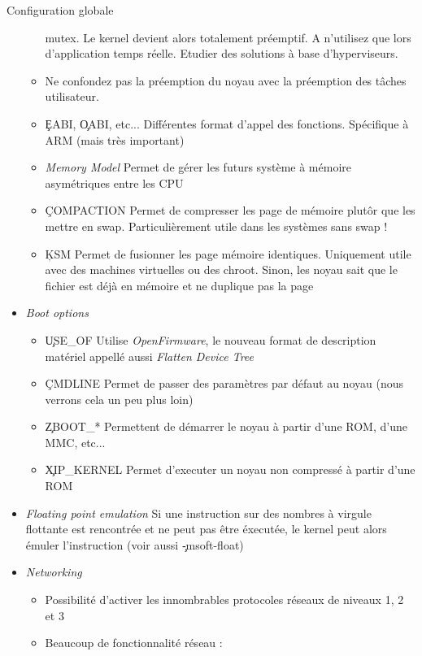 \begin{frame}[fragile=singleslide]{Configuration globale}
\begin{itemize}
\begin{itemize}
      mutex.  Le   kernel  devient  alors   totalement  préemptif.   A
      n'utilisez  que lors  d'application temps  réelle.   Etudier des
      solutions à base d'hyperviseurs.
    \item Ne confondez  pas la préemption du noyau  avec la préemption
      des tâches utilisateur.
    \item \c{EABI},  \c{OABI}, etc...  Différentes  format d'appel des
      fonctions. Spécifique à ARM (mais très important)
    \item  \emph{Memory Model} Permet  de gérer  les futurs  système à
      mémoire asymétriques entre les CPU
    \item  \c{COMPACTION} Permet  de  compresser les  page de  mémoire
      plutôr que  les mettre en swap. Particulièrement  utile dans les
      systèmes sans swap !
    \item  \c{KSM} Permet  de fusionner  les page  mémoire identiques.
      Uniquement   utile   avec  des   machines   virtuelles  ou   des
      chroot. Sinon, les noyau sait que le fichier est déjà en mémoire
      et ne duplique pas la page
    \end{itemize} 
  \item \emph{Boot options}
    \begin{itemize}
    \item \c{USE_OF} Utilise \emph{OpenFirmware}, le nouveau format de
      description matériel appellé aussi \emph{Flatten Device Tree}
    \item \c{CMDLINE}  Permet de passer  des paramètres par  défaut au
      noyau (nous verrons cela un peu plus loin)
    \item \c{ZBOOT_*}  Permettent de démarrer le noyau  à partir d'une
      ROM, d'une MMC, etc...
    \item \c{XIP_KERNEL}  Permet d'executer  un noyau non  compressé à
      partir d'une ROM
    \end{itemize}
  \item  \emph{Floating point  emulation} Si  une instruction  sur des
    nombres à  virgule flottante  est rencontrée et  ne peut  pas être
    éxecutée, le  kernel peut  alors émuler l'instruction  (voir aussi
    \c{-msoft-float})
  \item \emph{Networking}
    \begin{itemize}
    \item Possibilité d'activer les innombrables protocoles réseaux de
      niveaux 1, 2 et 3
    \item  {} Beaucoup  de fonctionnalité  réseau :

\end{itemize}
\end{itemize}
\end{frame}
